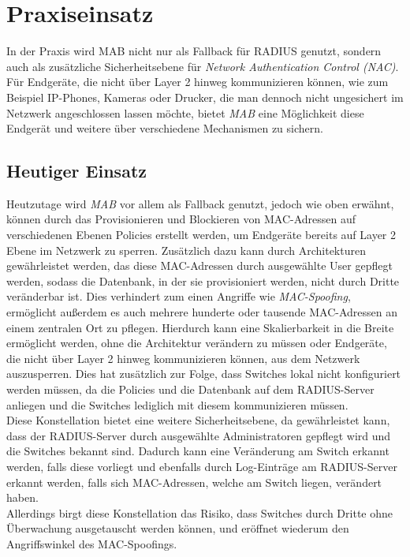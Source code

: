 \documentclass[conference]{IEEEtran}
\begin{document}
%

\vspace{1em}
\section{Praxiseinsatz}
In der Praxis wird MAB nicht nur als Fallback für RADIUS genutzt, sondern auch als zusätzliche Sicherheitsebene für \emph{Network Authentication Control (NAC)}. Für Endgeräte, die nicht über Layer 2 hinweg kommunizieren können, wie zum Beispiel IP-Phones, Kameras oder Drucker, die man dennoch nicht ungesichert im Netzwerk angeschlossen lassen möchte, bietet \emph{MAB} eine Möglichkeit diese Endgerät und weitere über verschiedene Mechanismen zu sichern.\\

\vspace{.5em}
\subsection{Heutiger Einsatz}
Heutzutage wird \emph{MAB} vor allem als Fallback genutzt, jedoch wie oben erwähnt, können durch das Provisionieren und Blockieren von MAC-Adressen auf verschiedenen Ebenen Policies erstellt werden, um Endgeräte bereits auf Layer 2 Ebene im Netzwerk zu sperren. Zusätzlich dazu kann durch Architekturen gewährleistet werden, das diese MAC-Adressen durch ausgewählte User gepflegt werden, sodass die Datenbank, in der sie provisioniert werden, nicht durch Dritte veränderbar ist. Dies verhindert zum einen Angriffe wie \emph{MAC-Spoofing}, ermöglicht außerdem es auch mehrere hunderte oder tausende MAC-Adressen an einem zentralen Ort zu pflegen. Hierdurch kann eine Skalierbarkeit in die Breite ermöglicht werden, ohne die Architektur verändern zu müssen oder Endgeräte, die nicht über Layer 2 hinweg kommunizieren können, aus dem Netzwerk auszusperren. Dies hat zusätzlich zur Folge, dass Switches lokal nicht konfiguriert werden müssen, da die Policies und die Datenbank auf dem RADIUS-Server anliegen und die Switches lediglich mit diesem kommunizieren müssen.\\

Diese Konstellation bietet eine weitere Sicherheitsebene, da gewährleistet kann, dass der RADIUS-Server durch ausgewählte Administratoren gepflegt wird und die Switches bekannt sind. Dadurch kann eine Veränderung am Switch erkannt werden, falls diese vorliegt und ebenfalls durch Log-Einträge am RADIUS-Server erkannt werden, falls sich MAC-Adressen, welche am Switch liegen, verändert haben.\\
Allerdings birgt diese Konstellation das Risiko, dass Switches durch Dritte ohne Überwachung ausgetauscht werden können, und eröffnet wiederum den Angriffswinkel des MAC-Spoofings.\\
\end{document}
